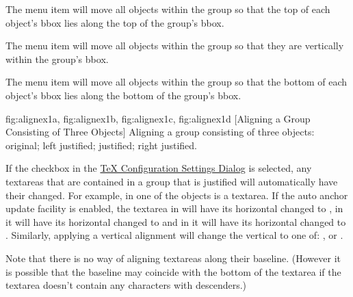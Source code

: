 
The  menu item will move all objects
within the \gls{group} so that the top of each object's \gls*{bbox} lies along the
top of the group's \gls*{bbox}.


The  menu item will move all objects
within the \gls{group} so that they are  vertically
within the group's \gls{bbox}.


The  menu item will move all objects
within the \gls{group} so that the bottom of each object's \gls*{bbox} lies
along the bottom of the group's \gls*{bbox}.

{
  {fig:alignex1a}{}{},
  {fig:alignex1b}{}{},
  {fig:alignex1c}{}{},
  {fig:alignex1d}{}{}
}
[Aligning a Group Consisting of Three Objects]
{Aligning a group consisting of three objects: 
 original; 
 left justified; 
  justified; 
 right justified.}

If the  \gls{checkbox} in the
\hyperref[sec:texconfig]{TeX Configuration Settings Dialog} is
selected, any \glspl{textarea} that are contained in a group that is
justified will automatically have their  changed.
For example, in  one of the objects is a
\gls*{textarea}.  If the auto anchor update facility is enabled, the
\gls*{textarea} in  will have its
horizontal  changed to ,
in  it will have its horizontal
 changed to  and in
 it will have its horizontal
 changed to . Similarly,
applying a vertical alignment will change the vertical
 to one of: ,
 or .

\begin{information}
Note that there is no way of aligning \glspl{textarea} along their
baseline. (However it is possible that the baseline may coincide
with the bottom of the \gls*{textarea} if the \gls*{textarea} doesn't contain
any characters with descenders.)
\end{information}

